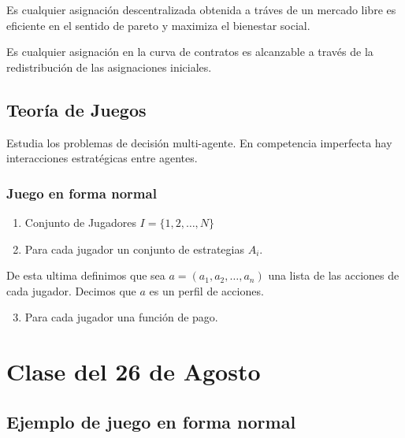 \documentclass[letterpaper,12pt,twocolumn]{report}
\begin{document}
\begin{tcolorbox}[title= Primer teorema del bienestar]
   
   Es cualquier asignación descentralizada obtenida a tráves de un mercado libre es eficiente en el sentido de pareto y maximiza el bienestar social.
   
\end{tcolorbox}

\begin{tcolorbox}[title= Segundo teorema del bienestar]
   
   Es cualquier asignación en la curva de contratos es alcanzable a través de la redistribución de las asignaciones iniciales.
   
\end{tcolorbox}

\subsection*{Teoría de Juegos }

Estudia los problemas de decisión multi-agente. En competencia imperfecta hay interacciones estratégicas entre agentes. 

\subsubsection*{Juego en forma normal}

\begin{enumerate}
    \item Conjunto de Jugadores $I=\{1,2,\dots,N\}$
    \item Para cada jugador un conjunto de estrategias $A_i$.
\end{enumerate}

De esta ultima definimos que sea $a=(a_1,a_2,\dots,a_n)$ una lista de las acciones de cada jugador. Decimos que $a$ es un perfil de acciones.

\begin{enumerate}
	\setcounter{enumi}{2}
    \item Para cada jugador una función de pago.
\end{enumerate}


\section{Clase del 26 de Agosto}

\subsection*{Ejemplo de juego en forma normal}
\end{document}
